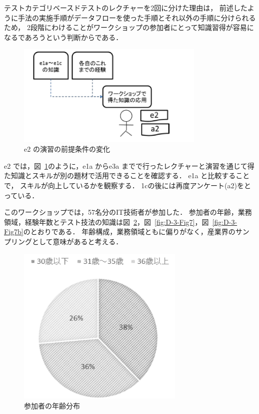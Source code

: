 テストカテゴリベースドテストのレクチャーを2回に分けた理由は， 前述したように手法の実施手順がデータフローを使った手順とそれ以外の手順に分けられるため， 2段階にわけることがワークショップの参加者にとって知識習得が容易になるであろうという判断からである．

\begin{figure}[h]
\begin{center}
\includegraphics[width=9cm]{./image/D-3-Fig9.png}
\caption{e2 の演習の前提条件の変化}
\label{fig:D-3-Fig9}
\end{center}
\end{figure}
e2 では，図~\ref{fig:D-3-Fig9}のように，e1a からe3a までで行ったレクチャーと演習を通じて得た知識とスキルが別の題材で活用できることを確認する． e1a と比較することで， スキルが向上しているかを観察する．
1cの後には再度アンケート(a2)をとっている．

このワークショップでは，57名分のIT技術者が参加した．
参加者の年齢，業務領域，経験年数とテスト技法の知識は図~\ref{fig:D-3-Fig6}，図~\ref{fig:D-3-Fig7}，図~\ref{fig:D-3-Fig7b}のとおりである．
年齢構成，業務領域ともに偏りがなく，産業界のサンプリングとして意味があると考える．

\begin{figure}[H]
\begin{center}
\includegraphics[width=8cm]{./image/D-3-Fig6.png}
\caption{参加者の年齢分布}
\label{fig:D-3-Fig6}
\end{center}
\end{figure}

